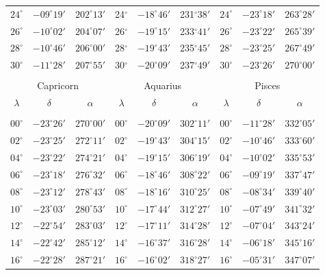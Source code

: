 \begin{table}[!h]
\begin{tabular}{ccc|ccc|ccc}
$24^\circ$ & $-09^\circ19'$ & $202^\circ13'$ & 24$^\circ$ & $-18^\circ46'$ & 231$^\circ$$38'$ & $24^\circ$ & $-23^\circ18'$ & $263^\circ28'$\\
$26^\circ$ & $-10^\circ02'$ & $204^\circ07'$ & 26$^\circ$ & $-19^\circ15'$ & 233$^\circ$$41'$ & $26^\circ$ & $-23^\circ22'$ & $265^\circ39'$\\
$28^\circ$ & $-10^\circ46'$ & $206^\circ00'$ & 28$^\circ$ & $-19^\circ43'$ & 235$^\circ$$45'$ & $28^\circ$ & $-23^\circ25'$ & $267^\circ49'$\\
$30^\circ$ & $-11^\circ28'$ & $207^\circ55'$ & 30$^\circ$ & $-20^\circ09'$ & 237$^\circ$$49'$ & $30^\circ$ & $-23^\circ26'$ & $270^\circ00'$\\
\multicolumn{9}{c}{}\\
\multicolumn{3}{c}{Capricorn}\vline & \multicolumn{3}{c}{Aquarius} \vline& \multicolumn{3}{c}{Pisces}\\\hline
$\lambda$& $\delta$& $\alpha$& $\lambda$& $\delta$& $\alpha$& $\lambda$& $\delta$& $\alpha$\\\hline
&&&&&&&&\\[-2ex]
$00^\circ$ & $-23^\circ26'$ & $270^\circ00'$ & $00^\circ$ & $-20^\circ09'$ & $302^\circ11'$ & $00^\circ$ & $-11^\circ28'$ & $332^\circ05'$\\
$02^\circ$ & $-23^\circ25'$ & $272^\circ11'$ & $02^\circ$ & $-19^\circ43'$ & $304^\circ15'$ & $02^\circ$ & $-10^\circ46'$ & $333^\circ60'$\\
$04^\circ$ & $-23^\circ22'$ & $274^\circ21'$ & $04^\circ$ & $-19^\circ15'$ & $306^\circ19'$ & $04^\circ$ & $-10^\circ02'$ & $335^\circ53'$\\
$06^\circ$ & $-23^\circ18'$ & $276^\circ32'$ & $06^\circ$ & $-18^\circ46'$ & $308^\circ22'$ & $06^\circ$ & $-09^\circ19'$ & $337^\circ47'$\\
$08^\circ$ & $-23^\circ12'$ & $278^\circ43'$ & $08^\circ$ & $-18^\circ16'$ & $310^\circ25'$ & $08^\circ$ & $-08^\circ34'$ & $339^\circ40'$\\
$10^\circ$ & $-23^\circ03'$ & $280^\circ53'$ & $10^\circ$ & $-17^\circ44'$ & $312^\circ27'$ & $10^\circ$ & $-07^\circ49'$ & $341^\circ32'$\\
$12^\circ$ & $-22^\circ54'$ & $283^\circ03'$ & $12^\circ$ & $-17^\circ11'$ & $314^\circ28'$ & $12^\circ$ & $-07^\circ04'$ & $343^\circ24'$\\
$14^\circ$ & $-22^\circ42'$ & $285^\circ12'$ & $14^\circ$ & $-16^\circ37'$ & $316^\circ28'$ & $14^\circ$ & $-06^\circ18'$ & $345^\circ16'$\\
$16^\circ$ & $-22^\circ28'$ & $287^\circ21'$ & $16^\circ$ & $-16^\circ02'$ & $318^\circ27'$ & $16^\circ$ & $-05^\circ31'$ & $347^\circ07'$\\

\end{tabular}
\end{table}
